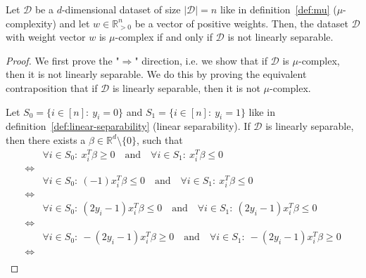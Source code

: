 \begin{theorem}
    \label{theorem:mu-linear-separability}
    Let $\mathcal{D}$ be a $d$-dimensional dataset of size
    $|\mathcal{D}| = n$ like in definition~\ref{def:mu}
    ($\mu$-complexity)
    and let $w \in \mathbb{R}^n_{>0}$ be a vector of
    positive weights.
    Then, the dataset
    $\mathcal{D}$ with weight vector $w$ is $\mu$-complex
    if and only if $\mathcal{D}$ is not linearly separable.
\end{theorem}
\begin{proof}
We first prove the "$\Rightarrow$" direction, i.e. we show
that if $\mathcal{D}$ is $\mu$-complex,
then it is not linearly separable.
We do this by proving the equivalent
contraposition that if $\mathcal{D}$ is linearly separable,
then it is not $\mu$-complex.

Let $S_0 = \{i \in [n]:\ y_i = 0\}$ and $S_1 = \{i \in [n]:\ y_i = 1\}$
like in definition~\ref{def:linear-separability}
(linear separability).
If $\mathcal{D}$ is linearly separable, then there exists
a $\beta \in \mathbb{R}^d \setminus \{0\}$, such that
\begingroup
\allowdisplaybreaks
\begin{align*}
                & \forall i \in S_0:\ x_i^T \beta \geq 0\quad \text{and}\quad \forall i \in S_1:\ x_i^T \beta \leq 0                         \\
    \iff        &                                                                                                                            \\
                & \forall i \in S_0:\ (-1) x_i^T \beta \leq 0\quad \text{and}\quad \forall i \in S_1:\ x_i^T \beta \leq 0                    \\
    \iff        &                                                                                                                            \\
                & \forall i \in S_0:\ (2y_i - 1) x_i^T \beta \leq 0\quad \text{and}\quad \forall i \in S_1:\ (2y_i - 1) x_i^T \beta \leq 0   \\
    \iff        &                                                                                                                            \\
                & \forall i \in S_0:\ -(2y_i - 1) x_i^T \beta \geq 0\quad \text{and}\quad \forall i \in S_1:\ -(2y_i - 1) x_i^T \beta \geq 0 \\
    \iff        &                                                                                                                            \\

\end{align*}
\end{proof}
